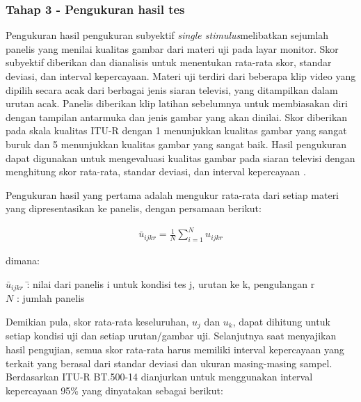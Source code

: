 \subsubsection{Tahap 3 - Pengukuran hasil tes}
\hspace{1,2cm}
Pengukuran hasil pengukuran subyektif  \textit{single stimulus}melibatkan sejumlah panelis yang menilai kualitas gambar dari materi uji pada layar monitor. Skor subyektif diberikan dan dianalisis untuk menentukan rata-rata skor, standar deviasi, dan interval kepercayaan. Materi uji terdiri dari beberapa klip video yang dipilih secara acak dari berbagai jenis siaran televisi, yang ditampilkan dalam urutan acak. Panelis diberikan klip latihan sebelumnya untuk membiasakan diri dengan tampilan antarmuka dan jenis gambar yang akan dinilai. Skor diberikan pada skala kualitas ITU-R dengan 1 menunjukkan kualitas gambar yang sangat buruk dan 5 menunjukkan kualitas gambar yang sangat baik. Hasil pengukuran dapat digunakan untuk mengevaluasi kualitas gambar pada siaran televisi dengan menghitung skor rata-rata, standar deviasi, dan interval kepercayaan \citep{IRP2022}.

Pengukuran hasil yang pertama adalah mengukur rata-rata dari setiap materi yang dipresentasikan ke panelis, dengan persamaan berikut:

\begin{equation}
	\begin{aligned}
		\bar{u}_{ijkr}=\frac{1}{N}\sum_{i=1}^{N}u_{ijkr}
	\end{aligned}
\end{equation}

\hspace{-1,2cm}dimana:
\vspace{-0.5cm}
\begin{tabbing}
	$\bar{u}_{ijkr}$ \hspace{2em} \= : nilai dari panelis i untuk kondisi tes j, urutan ke k, pengulangan r \\
	$N$ \> : jumlah panelis \\
\end{tabbing}
\vspace{-0.5cm}

Demikian pula, skor rata-rata keseluruhan, $u_j$ dan $u_k$, dapat dihitung untuk setiap kondisi uji dan setiap urutan/gambar uji. Selanjutnya saat menyajikan hasil pengujian, semua skor rata-rata harus memiliki interval kepercayaan yang terkait yang berasal dari standar deviasi dan ukuran masing-masing sampel. Berdasarkan ITU-R BT.500-14 dianjurkan untuk menggunakan interval kepercayaan 95\% yang dinyatakan sebagai berikut:

